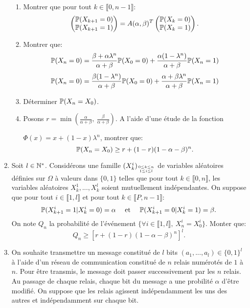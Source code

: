 \begin{enumerate}
\begin{enumerate}
 \item Montrer que pour tout $k\in \llbracket 0, n-1\rrbracket$:
 \[ \begin{pmatrix}
     \P(X_{k+1} = 0)\\
     \P(X_{k+1} = 1)
    \end{pmatrix} = A(\alpha, \beta)^{T}\begin{pmatrix}
                                                 \P(X_{k} = 0)\\
                                                 \P(X_{k} = 1)
                                        \end{pmatrix}.\]
  \item Montrer que:
  \[ \P(X_{n} = 0) = \frac{\beta + \alpha \lambda^{n}}{\alpha + \beta}\P(X_{0} = 0) + \frac{\alpha(1- \lambda^{n})}{\alpha + \beta}\P(X_{n} = 1)\]
   \[ \P(X_{n} = 0) = \frac{\beta (1 -  \lambda^{n})}{\alpha + \beta}\P(X_{0} = 0) + \frac{\alpha  + \beta \lambda^{n}}{\alpha + \beta}\P(X_{n} = 1)\]
  \item Déterminer $\P(X_{n} = X_{0})$. 
  \item Posons $\displaystyle{r = \min \left ( \frac{\alpha}{\alpha + \beta},\ \frac{\beta}{\alpha  + \beta}\right )}$. A l'aide d'une étude de la fonction 
  
  $\Phi (x) = x + (1-x)\lambda^{n}$, montrer que:
  \[ \P(X_{n} = X_{0}) \geq r + (1-r)(1-\alpha - \beta)^{n}.\]
\end{enumerate}




\item Soit $l\in \N^{*}$. Considérons une famille $(X_{k}^{i})_{\empil{0\leq k\leq n}{1\leq i\leq l}}$ de variables aléatoires  définies sur $\Omega$ à valeurs dans $\{ 0, 1\}$ telles que pour tout
$k\in \llbracket 0, n\rrbracket$, les variables aléatoires $X_{k}^{1}, ..., X_{k}^{l}$ soient mutuellement indépendantes. On suppose que pour tout $i\in \llbracket 1, l\rrbracket$ et pour tout 
$k\in \llbracket P, n-1\rrbracket$:
\[ \P(X_{k+1}^{i} = 1|X_{k}^{i} = 0) = \alpha \quad \text{ et } \quad \P(X_{k+1}^{i} = 0|X_{k}^{i} = 1) = \beta.\]
On note $Q_{n}$ la probabilité de l'événement $\{ \forall i\in \llbracket 1, l\rrbracket,\  X_{n}^{i} = X_{0}^{i} \}$. Monter que:
\[ Q_{n} \geq \left [ r + (1-r)(1-\alpha - \beta)^{n}\right ]^{l}.\]




\item On souhaite transmettre un message constitué de $l$ bits $(a_{1}, ..., a_{l})\in \{ 0, 1\}^{l}$ à l'aide d'un réseau de communication constitué de $n$ relais numérotés de $1$ à $n$.
Pour être transmis, le message doit passer successivement par les $n$ relais. Au passage de chaque relais, chaque bit du message a une probilité $\alpha$ d'être modifié. On suppose que les relais agissent 
indépendamment les uns des autres et indépendamment sur chaque bit.


\end{enumerate}
